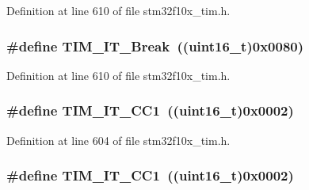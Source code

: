 Definition at line 610 of file stm32f10x\+\_\+tim.\+h.

\subsubsection[{\texorpdfstring{T\+I\+M\+\_\+\+I\+T\+\_\+\+Break}{TIM_IT_Break}}]{\setlength{\rightskip}{0pt plus 5cm}\#define T\+I\+M\+\_\+\+I\+T\+\_\+\+Break~(({\bf uint16\+\_\+t})0x0080)}\hypertarget{group___t_i_m__interrupt__sources_gad16adab3ac1a4a552a86da069702f24b}{}\label{group___t_i_m__interrupt__sources_gad16adab3ac1a4a552a86da069702f24b}


Definition at line 610 of file stm32f10x\+\_\+tim.\+h.

\subsubsection[{\texorpdfstring{T\+I\+M\+\_\+\+I\+T\+\_\+\+C\+C1}{TIM_IT_CC1}}]{\setlength{\rightskip}{0pt plus 5cm}\#define T\+I\+M\+\_\+\+I\+T\+\_\+\+C\+C1~(({\bf uint16\+\_\+t})0x0002)}\hypertarget{group___t_i_m__interrupt__sources_ga02267a938ab4722c5013fffa447cf5a6}{}\label{group___t_i_m__interrupt__sources_ga02267a938ab4722c5013fffa447cf5a6}


Definition at line 604 of file stm32f10x\+\_\+tim.\+h.

\subsubsection[{\texorpdfstring{T\+I\+M\+\_\+\+I\+T\+\_\+\+C\+C1}{TIM_IT_CC1}}]{\setlength{\rightskip}{0pt plus 5cm}\#define T\+I\+M\+\_\+\+I\+T\+\_\+\+C\+C1~(({\bf uint16\+\_\+t})0x0002)}\hypertarget{group___t_i_m__interrupt__sources_ga02267a938ab4722c5013fffa447cf5a6}{}\label{group___t_i_m__interrupt__sources_ga02267a938ab4722c5013fffa447cf5a6}



